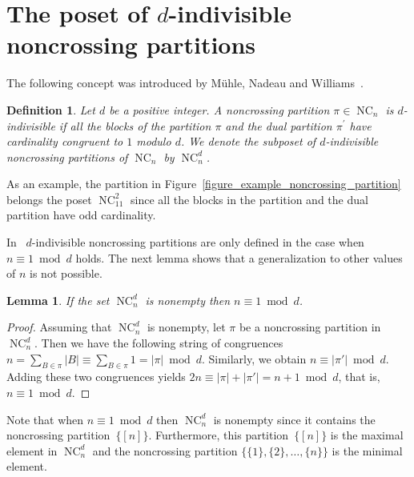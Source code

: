 \documentclass[11pt]{amsart}
\newtheorem{definition}[theorem]{Definition}
\newtheorem{lemma}[theorem]{Lemma}
\numberwithin{equation}{section}
\DeclareMathOperator{\NC}{NC}
\begin{document}
\section{The poset of $d$-indivisible noncrossing partitions}
\label{section_NC^{d}_{n}}

The following concept was introduced by M\"uhle, Nadeau and
Williams~\cite{Muhle_Nadeau_Williams}.  

\begin{definition}
  Let $d$ be a positive integer. A noncrossing partition $\pi\in\NC_{n}$
  is {\em $d$-indivisible} if all the blocks of the partition $\pi$ and
  the dual partition $\pi^{\prime}$ have cardinality congruent to $1$
  modulo $d$. We denote the subposet of $d$-indivisible noncrossing
  partitions of $\NC_{n}$ by $\NC_{n}^{d}$.
\end{definition}  
As an example, the partition in
Figure~\ref{figure_example_noncrossing_partition}
belongs the poset $\NC^{2}_{11}$
since all the blocks in the partition and the dual partition
have odd cardinality.

In~\cite{Muhle_Nadeau_Williams} $d$-indivisible noncrossing partitions are only defined
in the case when $n \equiv 1 \bmod d$ holds. The next lemma shows
that a generalization to other values of $n$ is not possible. 
\begin{lemma}
If the set $\NC^{d}_{n}$ is nonempty then $n \equiv 1 \bmod d$.
\label{lemma_fundamental}
\end{lemma}
\begin{proof}
Assuming that $\NC^{d}_{n}$ is nonempty,
let $\pi$ be a noncrossing partition in $\NC^{d}_{n}$.
Then we have the following string of congruences
$n = \sum_{B \in \pi} |B| \equiv  \sum_{B \in \pi} 1 = |\pi| \bmod d$.
Similarly, we obtain
$n \equiv |\pi'| \bmod d$.
Adding these two congruences yields
$2n \equiv |\pi| + |\pi'| = n+1 \bmod d$, that is, 
$n \equiv 1 \bmod d$.
\end{proof}

Note that when $n \equiv 1 \bmod d$ then $\NC^{d}_{n}$
is nonempty since it contains the noncrossing partition~$\{[n]\}$.
Furthermore, this partition~$\{[n]\}$ is the maximal element in $\NC^{d}_{n}$
and the noncrossing partition $\{\{1\}, \{2\}, \ldots,\{n\}\}$ is the
minimal element. 
\end{document}

